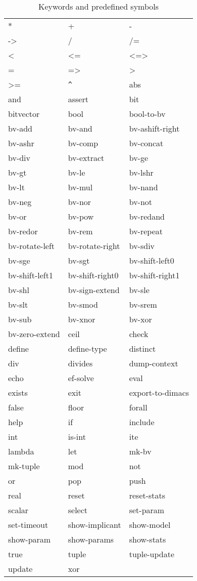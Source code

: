 \documentclass[11pt,twoside,fleqn,openright,titlepage]{cslreport}
\begin{document}
\begin{table}
\begin{small}
\begin{center}
\begin{tt}
\begin{tabular}{|p{3.4cm}|p{3.4cm}|p{3.4cm}|}
\hline
* & + & - \\
-> & / & /= \\
< & <= & <=> \\
 = & => & > \\
>= & \verb|^| & abs \\
and & assert & bit \\
bitvector & bool & bool-to-bv \\
bv-add & bv-and & bv-ashift-right\\
bv-ashr & bv-comp & bv-concat \\
bv-div  & bv-extract & bv-ge \\
bv-gt  & bv-le & bv-lshr \\
bv-lt  & bv-mul & bv-nand \\
bv-neg & bv-nor & bv-not\\
bv-or  & bv-pow & bv-redand \\
bv-redor & bv-rem & bv-repeat \\
bv-rotate-left & bv-rotate-right & bv-sdiv \\
bv-sge & bv-sgt & bv-shift-left0 \\
bv-shift-left1 & bv-shift-right0 & bv-shift-right1 \\
bv-shl & bv-sign-extend & bv-sle \\
bv-slt & bv-smod & bv-srem \\
bv-sub & bv-xnor & bv-xor \\
bv-zero-extend & ceil & check \\
define & define-type & distinct \\
div & divides & dump-context \\
echo  & ef-solve & eval \\
exists & exit & export-to-dimacs \\
false & floor & forall \\
help & if & include \\
int & is-int & ite \\
lambda & let & mk-bv \\
mk-tuple & mod & not \\
or & pop & push \\
real & reset & reset-stats \\
scalar & select & set-param \\
set-timeout & show-implicant & show-model \\
show-param & show-params & show-stats\\
true & tuple & tuple-update \\
update & xor &  \\
\hline
\end{tabular}
\end{tt}
\end{center}
\end{small}
\caption{Keywords and predefined symbols}
\label{syntax:keywords}
\end{table}
\end{document}
